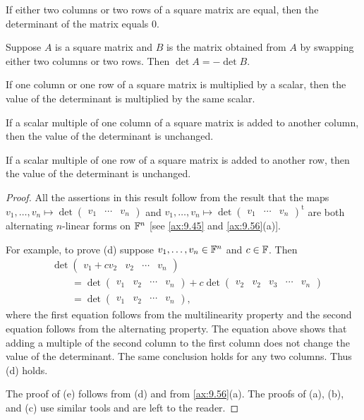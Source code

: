 \begin{result}\label{ax:9.57}\leavevmode
\begin{parts}
\item If either two columns or two rows of a square matrix are equal, then the
  determinant of the matrix equals $0$.
\item Suppose $A$ is a square matrix and $B$ is the matrix obtained from $A$ by
  swapping either two columns or two rows. Then $\det A=-\det B$.
\item If one column or one row of a square matrix is multiplied by a scalar,
  then the value of the determinant is multiplied by the same scalar.
\item If a scalar multiple of one column of a square matrix is added to another
  column, then the value of the determinant is unchanged.
\item If a scalar multiple of one row of a square matrix is added to another
  row, then the value of the determinant is unchanged.
\end{parts}
\end{result}

\begin{proof}
All the assertions in this result follow from the result that the maps
$v_1,\dots,v_n\mapsto\det\begin{pmatrix} v_1 & \cdots & v_n \end{pmatrix}$ and
$v_1,\dots,v_n\mapsto
\det\begin{pmatrix} v_1 & \cdots & v_n \end{pmatrix}^{\mathrm{t}}$ are both
alternating $n$-linear forms on $\mathbb{F}^n$ [see \ref{ax:9.45} and
\ref{ax:9.56}(a)].

For example, to prove (d) suppose $v_1,\dots,v_n\in\mathbb{F}^n$ and $c\in\mathbb{F}$. Then
\begin{align*}
&\det\begin{pmatrix} v_1+cv_2 & v_2 & \cdots & v_n \end{pmatrix}\\
&\qquad= \det\begin{pmatrix} v_1 & v_2 & \cdots & v_n \end{pmatrix}
  + c\det\begin{pmatrix} v_2 & v_2 & v_3 & \cdots & v_n \end{pmatrix}\\
&\qquad= \det\begin{pmatrix} v_1 & v_2 & \cdots & v_n \end{pmatrix},
\end{align*}
where the first equation follows from the multilinearity property and the
second equation follows from the alternating property. The equation above
shows that adding a multiple of the second column to the first column does not
change the value of the determinant. The same conclusion holds for any two
columns. Thus (d) holds.

The proof of (e) follows from (d) and from \ref{ax:9.56}(a). The proofs of (a),
(b), and (c) use similar tools and are left to the reader.
\end{proof}

